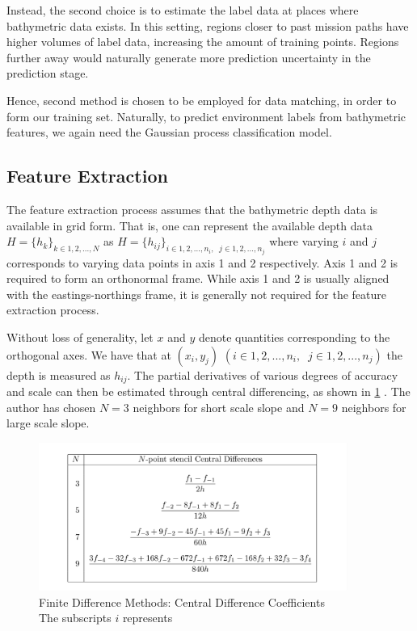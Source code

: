 			Instead, the second choice is to estimate the label data at places where bathymetric data exists. In this setting, regions closer to past mission paths have higher volumes of label data, increasing the amount of training points. Regions further away would naturally generate more prediction uncertainty in the prediction stage.
			
			Hence, second method is chosen to be employed for data matching, in order to form our training set. Naturally, to predict environment labels from bathymetric features, we again need the Gaussian process classification model.
			
			\FloatBarrier
	
		\subsection{Feature Extraction}
		\label{Background:OceanEnvironmentModeling:FeatureExtraction}
		
			The feature extraction process assumes that the bathymetric depth data is available in grid form. That is, one can represent the available depth data $H = \{h_{k}\}_{k \in {1, 2, ..., N}}$ as $H = \{h_{ij}\}_{i \in {1, 2, ..., n_{i}}, \;\; j \in {1, 2, ..., n_{j}}}$ where varying $i$ and $j$ corresponds to varying data points in axis 1 and 2 respectively. Axis 1 and 2 is required to form an orthonormal frame. While axis 1 and 2 is usually aligned with the eastings-northings frame, it is generally not required for the feature extraction process.
			
			Without loss of generality, let $x$ and $y$ denote quantities corresponding to the orthogonal axes. We have that at $(x_{i}, y_{j})$ $(i \in {1, 2, ..., n_{i}}, \;\; j \in {1, 2, ..., n_{j}})$ the depth is measured as $h_{ij}$. The partial derivatives of various degrees of accuracy and scale can then be estimated through central differencing, as shown in \cref{Background:OceanEnvironmentModeling:Figure:centraldifferencecofficients} \citep{CentralDifferenceTable}. The author has chosen $N = 3$ neighbors for short scale slope and $N = 9$ neighbors for large scale slope.
			
			\begin{figure}[!htbp]
				\centering
					\includegraphics[width=0.9\textwidth]{Figures/centraldifferencecofficients.png}
				\caption{Finite Difference Methods: Central Difference Coefficients \\
				The subscripts $i$ represents  }
				\label{Background:OceanEnvironmentModeling:Figure:centraldifferencecofficients}
			\end{figure}			

